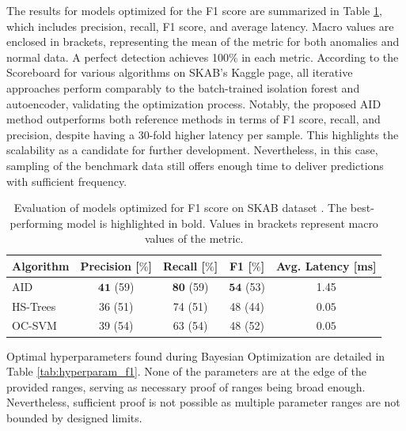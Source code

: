 The results for models optimized for the F1 score are summarized in Table \ref{tab:perf_comp_f1}, which includes precision, recall, F1 score, and average latency. Macro values are enclosed in brackets, representing the mean of the metric for both anomalies and normal data. A perfect detection achieves 100\% in each metric. According to the Scoreboard for various algorithms on SKAB's Kaggle page, all iterative approaches perform comparably to the batch-trained isolation forest and autoencoder, validating the optimization process. Notably, the proposed AID method outperforms both reference methods in terms of F1 score, recall, and precision, despite having a 30-fold higher latency per sample. This highlights the scalability as a candidate for further development. Nevertheless, in this case, sampling of the benchmark data still offers enough time to deliver predictions with sufficient frequency.

\begin{table}[htbp]
\caption{Evaluation of models optimized for F1 score on SKAB dataset \citep{skab2020}. The best-performing model is highlighted in bold. Values in brackets represent macro values of the metric.}
\begin{center}
\label{tab:perf_comp_f1}
\begin{tabular}{|l|c|c|c|c|}
 \hline
 \textbf{Algorithm} & Precision [$\%$] & Recall [$\%$] & F1 [$\%$] & Avg. Latency [ms] \\
 \hline
 AID & $\boldsymbol{41}$ (59) & $\boldsymbol{80}$ (59) & $\boldsymbol{54}$ (53) & 1.45 \\
 \hline
 HS-Trees & 36 (51) & 74 (51) & 48 (44) & $\boldsymbol{0.05}$ \\
 \hline
 OC-SVM & 39 (54) & 63 (54) & 48 (52) & $\boldsymbol{0.05}$ \\
 \hline
\end{tabular}
\end{center}
\end{table}

Optimal hyperparameters found during Bayesian Optimization are detailed in Table \ref{tab:hyperparam_f1}. None of the parameters are at the edge of the provided ranges, serving as necessary proof of ranges being broad enough. Nevertheless, sufficient proof is not possible as multiple parameter ranges are not bounded by designed limits.

